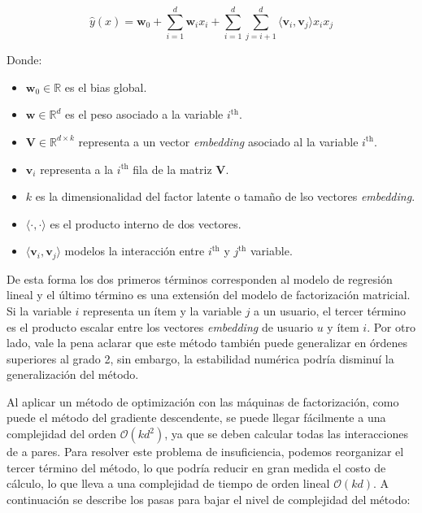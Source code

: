 \documentclass[11pt,a4paper,twoside]{thesis}
\begin{document}
\begin{equation}
	\hat{y}(x) = \mathbf{w}_0 + \sum_{i=1}^d \mathbf{w}_i x_i + \sum_{i=1}^d\sum_{j=i+1}^d \langle\mathbf{v}_i, \mathbf{v}_j\rangle x_i x_j
\end{equation}
\begin{description}
	\item[Donde:]
\end{description}
\begin{itemize}
	\item $\mathbf{w}_0 \in \mathbb{R}$ es el bias global.
	\item $\mathbf{w} \in \mathbb{R}^d$ es el peso asociado a la variable $i^\mathrm{th}$.
	\item $\mathbf{V} \in \mathbb{R}^{d\times k}$ representa a un vector \textit{embedding} asociado al la variable $i^\mathrm{th}$.
	\item $\mathbf{v}_i$ representa a la $i^\mathrm{th}$ fila de la matriz $\mathbf{V}$.
	\item $k$ es la dimensionalidad del factor latente o tamaño de lso vectores \textit{embedding}.
	\item $\langle\cdot, \cdot \rangle$ es el producto interno de dos vectores.
	\item $\langle \mathbf{v}_i, \mathbf{v}_j \rangle$ modelos la interacción entre $i^\mathrm{th}$ y $j^\mathrm{th}$ variable.
\end{itemize}

De esta forma los dos primeros términos corresponden al modelo de regresión
lineal y el último término es una extensión del modelo de factorización
matricial. Si la variable $i$ representa un ítem y la variable $j$ a un
usuario, el tercer término es el producto escalar entre los vectores
\textit{embedding} de usuario $u$ y ítem $i$. Por otro lado, vale la pena
aclarar que este método también puede generalizar en órdenes superiores al
grado 2, sin embargo, la estabilidad numérica podría disminuí la generalización
del método.

Al aplicar un método de optimización con las máquinas de factorización, como
puede el método del gradiente descendente, se puede llegar fácilmente a una
complejidad del orden $\mathcal{O}(kd^2)$, ya que se deben calcular todas las
interacciones de a pares. Para resolver este problema de insuficiencia, podemos
reorganizar el tercer término del método, lo que podría reducir en gran medida
el costo de cálculo, lo que lleva a una complejidad de tiempo de orden lineal
$\mathcal{O}(kd)$. A continuación se describe los pasas para bajar el nivel de
complejidad del método:
\end{document}
